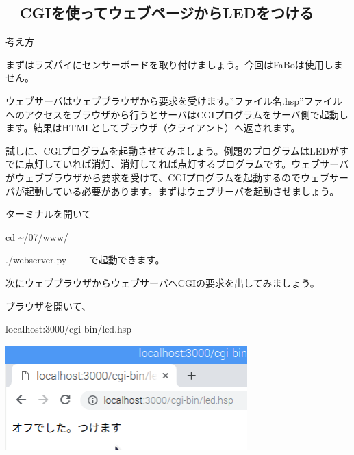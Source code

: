 \clearpage\subsection*{\theExercise　CGIを使ってウェブページからLEDをつける}
\addtocounter{Exercise}{-1}\label{E:CGI}


考え方

まずはラズパイにセンサーボードを取り付けましょう。今回はFaBoは使用しません。

ウェブサーバはウェブブラウザから要求を受けます。”ファイル名.hsp”ファイルへのアクセスをブラウザから行うとサーバはCGIプログラムをサーバ側で起動します。結果はHTMLとしてブラウザ（クライアント）へ返されます。

試しに、CGIプログラムを起動させてみましょう。例題のプログラムはLEDがすでに点灯していれば消灯、消灯してれば点灯するプログラムです。ウェブサーバがウェブブラウザから要求を受けて、CGIプログラムを起動するのでウェブサーバが起動している必要があります。まずはウェブサーバを起動させましょう。

ターミナルを開いて

cd {\textasciitilde}/07/www/

./webserver.py \ \ \ \ で起動できます。

%


次にウェブブラウザからウェブサーバへCGIの要求を出してみましょう。

ブラウザを開いて、

localhost:3000/cgi-bin/led.hsp

%


\centering
\includegraphics[width=0.7\textwidth]{text07-img/ome7-img051.png}
\flushleft

